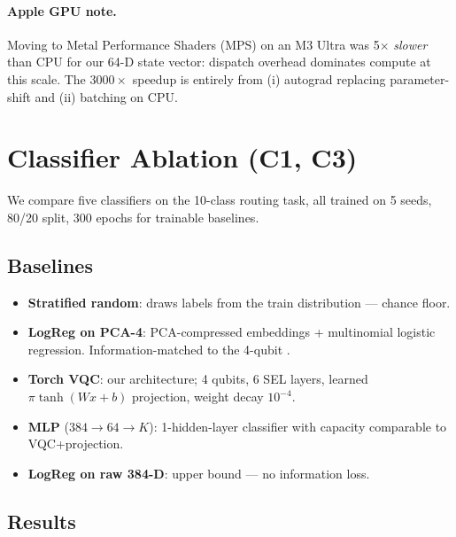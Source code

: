\paragraph{Apple GPU note.} Moving to Metal Performance Shaders (MPS) on an M3 Ultra was 5$\times$ \emph{slower} than CPU for our 64-D state vector: dispatch overhead dominates compute at this scale. The $3000\times$ speedup is entirely from (i) autograd replacing parameter-shift and (ii) batching on CPU.



\section{Classifier Ablation (C1, C3)}\label{sec:c1}

We compare five classifiers on the 10-class routing task, all trained on 5 seeds, 80/20 split, 300 epochs for trainable baselines.

\subsection{Baselines}
\begin{itemize}
\item \textbf{Stratified random}: draws labels from the train distribution --- chance floor.
\item \textbf{LogReg on PCA-4}: PCA-compressed embeddings + multinomial logistic regression. Information-matched to the 4-qubit \vqc.
\item \textbf{Torch VQC}: our architecture; 4 qubits, 6 SEL layers, learned $\pi \tanh(Wx+b)$ projection, weight decay $10^{-4}$.
\item \textbf{MLP} ($384 \to 64 \to K$): 1-hidden-layer classifier with capacity comparable to VQC+projection.
\item \textbf{LogReg on raw 384-D}: upper bound --- no information loss.
\end{itemize}

\subsection{Results}


